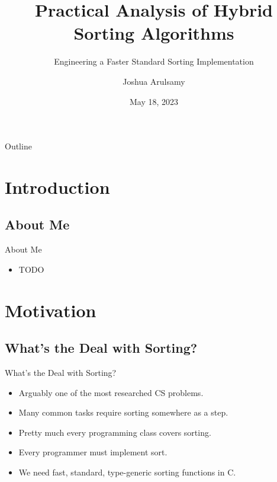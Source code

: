 \documentclass[13pt]{beamer}
\title{Practical Analysis of Hybrid Sorting Algorithms}
\subtitle{Engineering a Faster Standard Sorting Implementation}
\author{Joshua Arulsamy}
\date{May 18, 2023}
\begin{document}
\logo{}
\nocite{*}

\begin{frame}
	\titlepage
\end{frame}

\section{}
\subsection{}
\begin{frame}{Outline}
	\tableofcontents
\end{frame}

\section{Introduction}
\subsection{About Me}
\begin{frame}{About Me}
	\begin{itemize}
		\item TODO
	\end{itemize}
\end{frame}

\section{Motivation}
\subsection{What's the Deal with Sorting?}
\begin{frame}{What's the Deal with Sorting?}
	\begin{itemize}
		\item Arguably one of the most researched CS problems.
		\item Many common tasks require sorting somewhere as a step.
		\item Pretty much every programming class covers sorting.
		\item Every programmer must implement sort.
		\item We need fast, standard, type-generic sorting functions in C.
	\end{itemize}
\end{frame}
\end{document}
